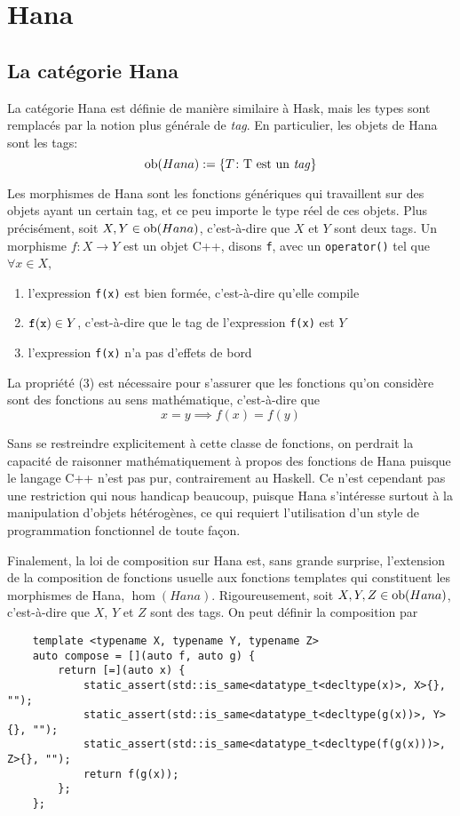 \section{Hana}


\subsection{La catégorie Hana}
La catégorie Hana est définie de manière similaire à Hask, mais les types
sont remplacés par la notion plus générale de \textit{tag}. En particulier,
les objets de Hana sont les tags:
\[
    \mathrm{ob}(Hana) := \{ T \colon \text{T est un \textit{tag}} \}
\]

Les morphismes de Hana sont les fonctions génériques qui travaillent sur des
objets ayant un certain tag, et ce peu importe le type réel de ces objets.
Plus précisément, soit $X, Y \in \mathrm{ob}(Hana)$, c'est-à-dire que $X$ et $Y$
sont deux tags. Un morphisme $f : X \to Y$ est un objet C++, disons {\tt f},
avec un {\tt operator()} tel que $\forall x \in X$,
\begin{enumerate}
    \item l'expression {\tt f(x)} est bien formée, c'est-à-dire qu'elle compile
    \item ${\tt f(x)} \in Y$, c'est-à-dire que le tag de l'expression {\tt f(x)} est $Y$
    \item l'expression {\tt f(x)} n'a pas d'effets de bord
\end{enumerate}

La propriété (3) est nécessaire pour s'assurer que les fonctions qu'on
considère sont des fonctions au sens mathématique, c'est-à-dire que
\[
    x = y \implies f(x) = f(y)
\]

Sans se restreindre explicitement à cette classe de fonctions, on perdrait la
capacité de raisonner mathématiquement à propos des fonctions de Hana puisque
le langage C++ n'est pas pur, contrairement au Haskell. Ce n'est cependant pas
une restriction qui nous handicap beaucoup, puisque Hana s'intéresse surtout à
la manipulation d'objets hétérogènes, ce qui requiert l'utilisation d'un style
de programmation fonctionnel de toute façon.

Finalement, la loi de composition sur Hana est, sans grande surprise,
l'extension de la composition de fonctions usuelle aux fonctions templates
qui constituent les morphismes de Hana, $\hom(Hana)$. Rigoureusement, soit
$X, Y, Z \in \mathrm{ob}(Hana)$, c'est-à-dire que $X$, $Y$ et $Z$ sont des tags.
On peut définir la composition par
\begin{verbatim}
    template <typename X, typename Y, typename Z>
    auto compose = [](auto f, auto g) {
        return [=](auto x) {
            static_assert(std::is_same<datatype_t<decltype(x)>, X>{}, "");
            static_assert(std::is_same<datatype_t<decltype(g(x))>, Y>{}, "");
            static_assert(std::is_same<datatype_t<decltype(f(g(x)))>, Z>{}, "");
            return f(g(x));
        };
    };
\end{verbatim}

